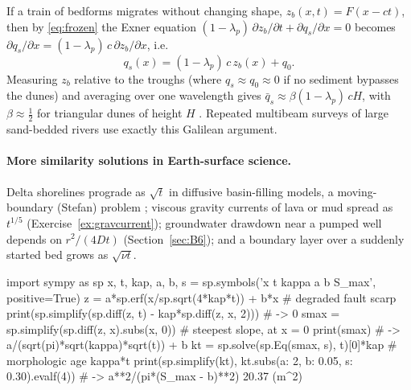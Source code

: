 \documentclass[11pt,letterpaper]{article}
\numberwithin{equation}{section}
\begin{document}
\begin{research}
If a train of bedforms migrates without changing shape, $z_b(x,t)=F(x-ct)$, then by \eqref{eq:frozen} the Exner
equation $(1-\lambda_p)\,\partial z_b/\partial t+\partial q_s/\partial x=0$ becomes
$\partial q_s/\partial x=(1-\lambda_p)\,c\,\partial z_b/\partial x$, i.e.
\begin{equation}\label{eq:dunetrack}
q_s(x)=(1-\lambda_p)\,c\,z_b(x)+q_0 .
\end{equation}
Measuring $z_b$ relative to the troughs (where $q_s\approx q_0\approx0$ if no sediment bypasses the dunes) and averaging over
one wavelength gives $\bar q_s\approx\beta(1-\lambda_p)\,cH$, with $\beta\approx\tfrac12$ for triangular dunes of height $H$
\citep{simons1965}. Repeated multibeam surveys of large sand-bedded rivers use exactly this Galilean argument.
\end{research}

\paragraph{More similarity solutions in Earth-surface science.} Delta shorelines prograde as $\sqrt t$ in diffusive
basin-filling models, a moving-boundary (Stefan) problem \citep{swenson2000}; viscous gravity currents of lava or mud spread
as $t^{1/5}$ \citep{huppert1982} (Exercise~\ref{ex:gravcurrent}); groundwater drawdown near a pumped well depends on
$r^2/(4Dt)$ (Section~\ref{sec:B6}); and a boundary layer over a suddenly started bed grows as $\sqrt{\nu t}$.

\begin{pycode}
import sympy as sp
x, t, kap, a, b, s = sp.symbols('x t kappa a b S_max', positive=True)
z = a*sp.erf(x/sp.sqrt(4*kap*t)) + b*x          # degraded fault scarp
print(sp.simplify(sp.diff(z, t) - kap*sp.diff(z, x, 2)))   # -> 0
smax = sp.simplify(sp.diff(z, x).subs(x, 0))    # steepest slope, at x = 0
print(smax)            # -> a/(sqrt(pi)*sqrt(kappa)*sqrt(t)) + b
kt = sp.solve(sp.Eq(smax, s), t)[0]*kap         # morphologic age kappa*t
print(sp.simplify(kt), kt.subs({a: 2, b: 0.05, s: 0.30}).evalf(4))
# -> a**2/(pi*(S_max - b)**2) 20.37      (m^2)
\end{pycode}
\end{document}
